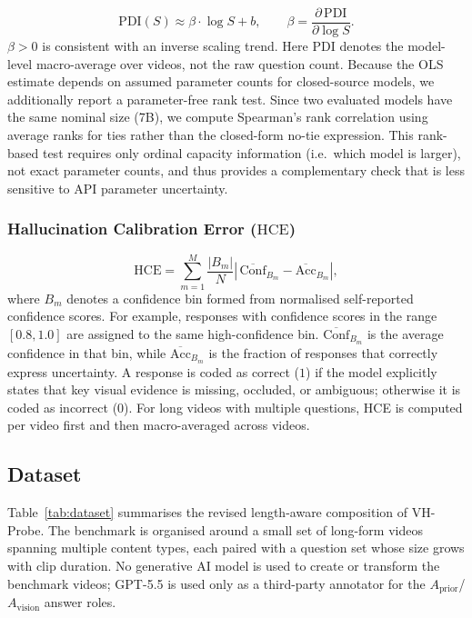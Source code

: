 \documentclass[final,5p,times,twocolumn]{elsarticle}
\newcommand{\PDI}{\mathrm{PDI}}
\newcommand{\HCE}{\mathrm{HCE}}
\newcommand{\Aprior}{A_{\mathrm{prior}}}
\newcommand{\Avision}{A_{\mathrm{vision}}}
\begin{document}
\begin{equation}
 \PDI(S) \approx \beta \cdot \log S + b, \qquad
 \beta = \frac{\partial\,\PDI}{\partial \log S}.
 \label{eq:beta}
\end{equation}
$\beta > 0$ is consistent with an inverse scaling trend. Here $\PDI$
denotes the model-level macro-average over videos, not the raw
question count.
Because the OLS estimate depends on assumed parameter counts for
closed-source models, we additionally report a parameter-free rank
test. Since two evaluated models have the same nominal size (7B), we
compute Spearman's rank correlation using average ranks for ties rather
than the closed-form no-tie expression. This rank-based test requires
only ordinal capacity information (i.e.\ which model is larger), not
exact parameter counts, and thus provides a complementary check that is
less sensitive to API parameter uncertainty.

\subsubsection{Hallucination Calibration Error ($\HCE$)}

\begin{equation}
 \HCE = \sum_{m=1}^{M}\frac{|B_m|}{N}
 \left|\,\overline{\mathrm{Conf}}_{B_m}
   - \overline{\mathrm{Acc}}_{B_m}\right|,
 \label{eq:hce}
\end{equation}
where $B_m$ denotes a confidence bin formed from normalised
self-reported confidence scores. For example, responses with confidence
scores in the range $[0.8,1.0]$ are assigned to the same high-confidence
bin. $\overline{\mathrm{Conf}}_{B_m}$ is the average confidence in that
bin, while $\overline{\mathrm{Acc}}_{B_m}$ is the fraction of responses
that correctly express uncertainty. A response is coded as correct
($1$) if the model explicitly states that key visual evidence is missing,
occluded, or ambiguous; otherwise it is coded as incorrect ($0$).
For long videos with multiple questions, HCE is computed per video
first and then macro-averaged across videos.

\subsection{Dataset}
Table~\ref{tab:dataset} summarises the revised length-aware
composition of VH-Probe. The benchmark is organised around a small
set of long-form videos spanning multiple content types, each paired
with a question set whose size grows with clip duration. No generative
AI model is used to create or transform the benchmark videos; GPT-5.5 is
used only as a third-party annotator for the $\Aprior$/$\Avision$ answer roles.
\end{document}
